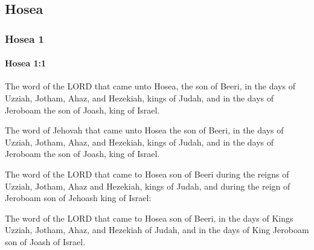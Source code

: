 \subsection{Hosea}
	\label{HOSEA}

	\subsubsection{Hosea 1} %
		\label{HOSEA-1}

		\paragraph{Hosea 1:1} %
			\label{HOSEA-1-1}

			The word of the LORD that came unto Hosea, the son of Beeri, in the days of Uzziah, Jotham, Ahaz, and Hezekiah, kings of Judah, and in the days of Jeroboam the son of Joash, king of Israel.

			\begin{versebox}
					\item[BHS] 
					\item[LXX] 
					\item[ASV] The word of Jehovah that came unto Hosea the son of Beeri, in the days of Uzziah, Jotham, Ahaz, and Hezekiah, kings of Judah, and in the days of Jeroboam the son of Joash, king of Israel.
					\item[NIV] The word of the LORD that came to Hosea son of Beeri during the reigns of Uzziah, Jotham, Ahaz and Hezekiah, kings of Judah, and during the reign of Jeroboam son of Jehoash king of Israel:
					\item[NRSV] The word of the LORD that came to Hosea son of Beeri, in the days of Kings Uzziah, Jotham, Ahaz, and Hezekiah of Judah, and in the days of King Jeroboam son of Joash of Israel.
			\end{versebox}

